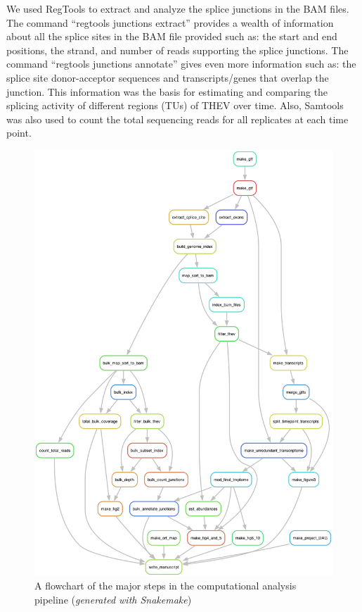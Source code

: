 \documentclass[
]{article}
\begin{document}
We used RegTools to extract and analyze the splice junctions in the BAM
files. The command ``regtools junctions extract'' provides a wealth of
information about all the splice sites in the BAM file provided such as:
the start and end positions, the strand, and number of reads supporting
the splice junctions. The command ``regtools junctions annotate'' gives
even more information such as: the splice site donor-acceptor sequences
and transcripts/genes that overlap the junction. This information was
the basis for estimating and comparing the splicing activity of
different regions (TUs) of THEV over time. Also, Samtools was also used
to count the total sequencing reads for all replicates at each time
point.

\begin{figure}
\centering
\includegraphics{project_map.png}
\caption{A flowchart of the major steps in the computational analysis
pipeline (\emph{generated with Snakemake})}
\end{figure}
\end{document}
